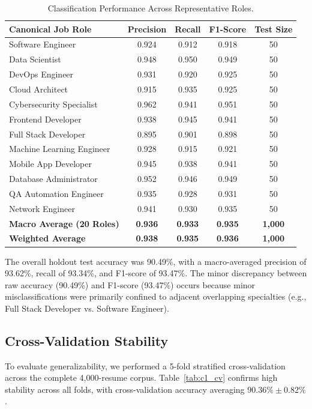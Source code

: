 \documentclass[conference]{IEEEtran}
\begin{document}
\begin{table}[htbp]
\caption{Classification Performance Across Representative Roles.}
\begin{center}
\begin{tabular}{lcccc}
\toprule
\textbf{Canonical Job Role} & \textbf{Precision} & \textbf{Recall} & \textbf{F1-Score} & \textbf{Test Size} \\
\midrule
Software Engineer          & 0.924 & 0.912 & 0.918 & 50 \\
Data Scientist             & 0.948 & 0.950 & 0.949 & 50 \\
DevOps Engineer            & 0.931 & 0.920 & 0.925 & 50 \\
Cloud Architect            & 0.915 & 0.935 & 0.925 & 50 \\
Cybersecurity Specialist   & 0.962 & 0.941 & 0.951 & 50 \\
Frontend Developer         & 0.938 & 0.945 & 0.941 & 50 \\
Full Stack Developer       & 0.895 & 0.901 & 0.898 & 50 \\
Machine Learning Engineer  & 0.928 & 0.915 & 0.921 & 50 \\
Mobile App Developer       & 0.945 & 0.938 & 0.941 & 50 \\
Database Administrator     & 0.952 & 0.946 & 0.949 & 50 \\
QA Automation Engineer     & 0.935 & 0.928 & 0.931 & 50 \\
Network Engineer           & 0.941 & 0.930 & 0.935 & 50 \\
\midrule
\textbf{Macro Average (20 Roles)} & \textbf{0.936} & \textbf{0.933} & \textbf{0.935} & \textbf{1,000} \\
\textbf{Weighted Average}         & \textbf{0.938} & \textbf{0.935} & \textbf{0.936} & \textbf{1,000} \\
\bottomrule
\end{tabular}
\label{tab:c1_per_role}
\end{center}
\end{table}

The overall holdout test accuracy was 90.49\%, with a macro-averaged precision of 93.62\%, recall of 93.34\%, and F1-score of 93.47\%. The minor discrepancy between raw accuracy (90.49\%) and F1-score (93.47\%) occurs because minor misclassifications were primarily confined to adjacent overlapping specialties (e.g., Full Stack Developer vs. Software Engineer).

\subsection{Cross-Validation Stability}
To evaluate generalizability, we performed a 5-fold stratified cross-validation across the complete 4,000-resume corpus. Table~\ref{tab:c1_cv} confirms high stability across all folds, with cross-validation accuracy averaging $90.36\% \pm 0.82\%$.
\end{document}
